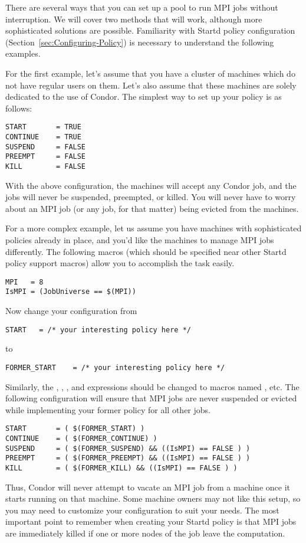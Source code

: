 There are several ways that you can set up a pool to run MPI jobs without 
interruption.  We will cover two methods that will work, although more
sophisticated solutions are possible. 
Familiarity with Startd policy configuration
(Section~\ref{sec:Configuring-Policy}) is necessary to understand the
following examples.

For the first example, let's assume that you have a cluster of machines which
do not have regular users on them.  Let's also assume that these machines are 
solely dedicated to the use of Condor.  
The simplest way to set up your policy is as follows:
\begin{verbatim}
START       = TRUE
CONTINUE    = TRUE
SUSPEND     = FALSE
PREEMPT     = FALSE
KILL        = FALSE
\end{verbatim}

With the above configuration, the machines will accept any Condor job, and the
jobs will never be suspended, preempted, or killed.  You will never have to 
worry about an MPI job (or any job, for that matter) being evicted from the 
machines.

For a more complex example, let us assume you have machines with sophisticated 
policies already in place, and you'd like the machines to manage MPI jobs 
differently.  The following macros (which should be specified
near other Startd policy support macros) allow you to accomplish the task 
easily.
\begin{verbatim}
MPI	  = 8
IsMPI = (JobUniverse == $(MPI))
\end{verbatim}
Now change your configuration from
\begin{verbatim}
START	= /* your interesting policy here */
\end{verbatim}
to 
\begin{verbatim}
FORMER_START	= /* your interesting policy here */
\end{verbatim}
Similarly, the , , , and 
 expressions should be changed to macros named 
, etc.  The following configuration will ensure that
MPI jobs are never suspended or evicted while implementing your former policy
for all other jobs.
\begin{verbatim}
START		= ( $(FORMER_START) )
CONTINUE	= ( $(FORMER_CONTINUE) )
SUSPEND		= ( $(FORMER_SUSPEND) && ((IsMPI) == FALSE ) )
PREEMPT		= ( $(FORMER_PREEMPT) && ((IsMPI) == FALSE ) )
KILL		= ( $(FORMER_KILL) && ((IsMPI) == FALSE ) )
\end{verbatim}
Thus, Condor will never attempt to vacate an MPI job from a machine once 
it starts running on that machine.  
Some machine owners may not like this setup, so you may need to customize 
your configuration to suit your needs.  
The most important point to remember when creating your Startd policy is 
that MPI jobs are immediately killed if one or more nodes of the job leave
the computation.

